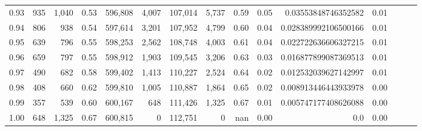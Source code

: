 \begin{tabular}{rrrrrrrrrrrrrrr}
0.93 &     935 &  1,040 &  0.53 &  596,808 &    4,007 &  107,014 &    5,737 &  0.59 &  0.05 &   0.03553848746352582 &      0.01 \\
0.94 &     806 &    938 &  0.54 &  597,614 &    3,201 &  107,952 &    4,799 &  0.60 &  0.04 &  0.028389992106500166 &      0.01 \\
0.95 &     639 &    796 &  0.55 &  598,253 &    2,562 &  108,748 &    4,003 &  0.61 &  0.04 &  0.022722636606327215 &      0.01 \\
0.96 &     659 &    797 &  0.55 &  598,912 &    1,903 &  109,545 &    3,206 &  0.63 &  0.03 &  0.016877899087369513 &      0.01 \\
0.97 &     490 &    682 &  0.58 &  599,402 &    1,413 &  110,227 &    2,524 &  0.64 &  0.02 &  0.012532039627142997 &      0.01 \\
0.98 &     408 &    660 &  0.62 &  599,810 &    1,005 &  110,887 &    1,864 &  0.65 &  0.02 &  0.008913446443933978 &      0.00 \\
0.99 &     357 &    539 &  0.60 &  600,167 &      648 &  111,426 &    1,325 &  0.67 &  0.01 &  0.005747177408626088 &      0.00 \\
1.00 &     648 &  1,325 &  0.67 &  600,815 &        0 &  112,751 &        0 &   nan &  0.00 &                   0.0 &      0.00 \\
\bottomrule
\end{tabular}
